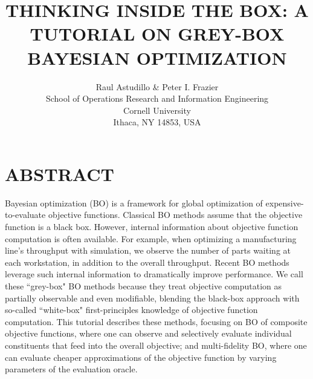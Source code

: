 \documentclass{wscpaperproc}
\theoremstyle{wsc}
\begin{document}
%
%

\title{THINKING INSIDE THE BOX: A TUTORIAL ON GREY-BOX BAYESIAN OPTIMIZATION}

\author{Raul Astudillo \& Peter I. Frazier\\[12pt]
School of Operations Research and Information Engineering\\
Cornell University\\
Ithaca, NY 14853, USA\\
}



\maketitle
\section*{ABSTRACT}
Bayesian optimization (BO) is a framework for global optimization of expensive-to-evaluate objective functions. Classical BO methods assume that the objective function is a black box. However, internal information about objective function computation is often available. For example, when optimizing a manufacturing line's throughput with simulation, we observe the number of parts waiting at each workstation, in addition to the overall throughput. Recent BO methods leverage such internal information to dramatically improve performance. We call these ``grey-box" BO methods because they treat objective computation as partially observable and even modifiable, blending the black-box approach with so-called ``white-box" first-principles knowledge of objective function computation. This  tutorial  describes these methods, focusing on BO of composite objective functions, where one can observe and selectively evaluate individual constituents that feed into the overall objective; and multi-fidelity BO, where one can evaluate cheaper approximations of the objective function by varying parameters of the evaluation oracle.
\end{document}
